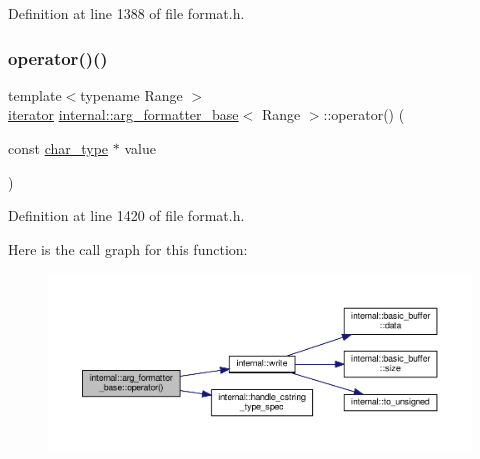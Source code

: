 Definition at line 1388 of file format.\+h.

\mbox{\label{classinternal_1_1arg__formatter__base_a6430303a592b0f1f1abb82dd0a745cc6}} 
\subsubsection{\texorpdfstring{operator()()}{operator()()}\hspace{0.1cm}{\footnotesize\ttfamily [4/6]}}
{\footnotesize\ttfamily template$<$typename Range $>$ \\
\hyperlink{classinternal_1_1arg__formatter__base_a87622fdc9716fee6a6de2ae496e3a54f}{iterator} \hyperlink{classinternal_1_1arg__formatter__base}{internal\+::arg\+\_\+formatter\+\_\+base}$<$ Range $>$\+::operator() (\begin{DoxyParamCaption}\item[{const \hyperlink{classinternal_1_1arg__formatter__base_a407930bf282880d2ca45dfa8f5d2034b}{char\+\_\+type} $\ast$}]{value }\end{DoxyParamCaption})\hspace{0.3cm}{\ttfamily [inline]}}



Definition at line 1420 of file format.\+h.

Here is the call graph for this function\+:
\nopagebreak
\begin{figure}[H]
\begin{center}
\leavevmode
\includegraphics[width=350pt]{classinternal_1_1arg__formatter__base_a6430303a592b0f1f1abb82dd0a745cc6_cgraph}
\end{center}
\end{figure}
\mbox{\label{classinternal_1_1arg__formatter__base_a3883b00024fb661ac96cd0e182002ff2}} 
